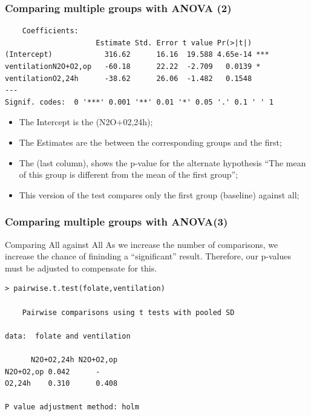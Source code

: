 \documentclass[10pt]{beamer}
\begin{document}
\begin{frame}
  \frametitle{Comparing multiple groups with ANOVA (2)}
  \begin{block}{}
{\small
\begin{verbatim}
    Coefficients:
                     Estimate Std. Error t value Pr(>|t|)    
(Intercept)            316.62      16.16  19.588 4.65e-14 ***
ventilationN2O+O2,op   -60.18      22.22  -2.709   0.0139 *  
ventilationO2,24h      -38.62      26.06  -1.482   0.1548    
---
Signif. codes:  0 '***' 0.001 '**' 0.01 '*' 0.05 '.' 0.1 ' ' 1
\end{verbatim}}
  \end{block}
  \begin{itemize}
  \item The Intercept is the  (N2O+02,24h);
  \item The Estimates are the  between the
    corresponding groups and the first;
  \item The  (last column), shows the
    p-value for the alternate hypothesis ``The mean of this group is
    different from the mean of the first group'';
  \item This version of the test compares only the first group (baseline) against all;
  \end{itemize}
\end{frame}

\begin{frame}
  \frametitle{Comparing multiple groups with ANOVA(3)}
  \begin{block}{Comparing All against All}
    As we increase the number of comparisons, we increase the chance
    of fininding a ``significant'' result. Therefore, our p-values
    must be adjusted to compensate for this.
  \end{block}
  \begin{block}{}
\begin{verbatim}
> pairwise.t.test(folate,ventilation)

    Pairwise comparisons using t tests with pooled SD 

data:  folate and ventilation 

      N2O+O2,24h N2O+O2,op
N2O+O2,op 0.042      -        
O2,24h    0.310      0.408    

P value adjustment method: holm
\end{verbatim}
  \end{block}
\end{frame}
\end{document}
